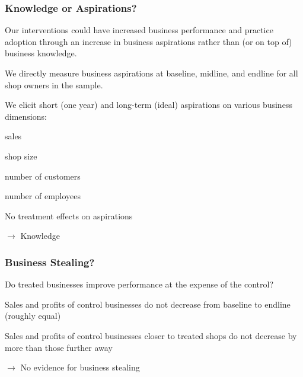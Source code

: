 \documentclass[hideothersubsections, usenames,dvipsnames,11pt]{beamer}
\newenvironment{itemize_3pt}{\itemize\addtolength{\itemsep}{3pt}}{\enditemize}
\begin{document}
\begin{frame}
\frametitle{Knowledge or Aspirations?}
\begin{itemize_3pt}
\item Our interventions could have increased business performance and practice adoption through an increase in business aspirations rather than (or on top of) business knowledge.
\vspace{0.1in}
\item We directly measure business aspirations at baseline, midline, and endline for all shop owners in the sample.
\vspace{0.1in}
\item We elicit short (one year) and long-term (ideal) aspirations on various business dimensions:
\vspace{0.1in}
    \begin{itemize_3pt}
    \item sales
    \item shop size
    \item number of customers
    \item number of employees
    \end{itemize_3pt}
\vspace{0.1in}
\item No treatment effects on aspirations
\vspace{0.1in}
\end{itemize_3pt}
$\rightarrow$ \textcolor{bdf}{Knowledge}
\end{frame}

\begin{frame}
\frametitle{Business Stealing?}
Do treated businesses improve performance at the expense of the control?
\vspace{0.1in}
\begin{itemize_3pt}
\item Sales and profits of \textcolor{bdf}{control businesses do not decrease} from baseline to endline (roughly equal)
\item Sales and profits of control businesses \textcolor{bdf}{closer to treated shops do not decrease by more} than those further away
\item[] $\rightarrow$ \textcolor{bdf}{No evidence for business stealing}
\end{itemize_3pt}
\end{frame}
\end{document}
